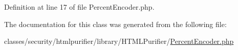 Definition at line 17 of file Percent\+Encoder.\+php.



The documentation for this class was generated from the following file\+:\begin{DoxyCompactItemize}
\item 
classes/security/htmlpurifier/library/\+H\+T\+M\+L\+Purifier/\hyperlink{PercentEncoder_8php}{Percent\+Encoder.\+php}\end{DoxyCompactItemize}
